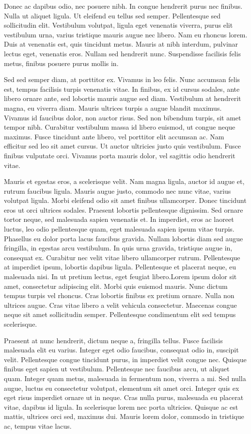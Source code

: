 Donec ac dapibus odio, nec posuere nibh. In congue hendrerit purus nec finibus. Nulla ut aliquet ligula. Ut eleifend eu tellus sed semper. Pellentesque sed sollicitudin elit. Vestibulum volutpat, ligula eget venenatis viverra, purus elit vestibulum urna, varius tristique mauris augue nec libero. Nam eu rhoncus lorem. Duis at venenatis est, quis tincidunt metus. Mauris at nibh interdum, pulvinar lectus eget, venenatis eros. Nullam sed hendrerit nunc. Suspendisse facilisis felis metus, finibus posuere purus mollis in.

Sed sed semper diam, at porttitor ex. Vivamus in leo felis. Nunc accumsan felis est, tempus facilisis turpis venenatis vitae. In finibus, ex id cursus sodales, ante libero ornare ante, sed lobortis mauris augue sed diam. Vestibulum at hendrerit magna, eu viverra diam. Mauris ultrices turpis a augue blandit maximus. Vivamus id faucibus dolor, non auctor risus. Sed non bibendum turpis, sit amet tempor nibh. Curabitur vestibulum massa id libero euismod, ut congue neque maximus. Fusce tincidunt ante libero, vel porttitor elit accumsan ac. Nam efficitur sed leo sit amet cursus. Ut auctor ultricies justo quis vestibulum. Fusce finibus vulputate orci. Vivamus porta mauris dolor, vel sagittis odio hendrerit vitae.

Mauris et egestas eros, a scelerisque velit. Nam magna ligula, auctor id augue et, rutrum faucibus ligula. Mauris augue justo, commodo nec nunc vitae, varius volutpat ligula. Morbi eleifend odio sit amet finibus ullamcorper. Donec tincidunt eros ut orci ultrices sodales. Praesent lobortis pellentesque dignissim. Sed ornare tortor neque, sed malesuada sapien venenatis et. In imperdiet, eros ac laoreet luctus, leo odio pellentesque quam, eget malesuada sapien ipsum vitae turpis. Phasellus eu dolor porta lacus faucibus gravida. Nullam lobortis diam sed augue fringilla, in egestas arcu vestibulum. In quis urna gravida, tristique augue in, consequat ex. Curabitur nec velit vitae libero ullamcorper rutrum. Pellentesque at imperdiet ipsum, lobortis dapibus ligula. Pellentesque et placerat neque, eu malesuada nisi. In ut pretium lectus, eget feugiat libero.Lorem ipsum dolor sit amet, consectetur adipiscing elit. Morbi quis euismod mauris. Nunc dictum tempus turpis vel rhoncus. Cras lobortis finibus ex pretium ornare. Nulla non ultrices augue. Cras vitae libero a velit vehicula consectetur. Maecenas congue neque sit amet sollicitudin semper. Pellentesque condimentum elit sed tempus scelerisque.

Praesent at nunc hendrerit, dictum neque a, fringilla tellus. Fusce facilisis malesuada elit eu varius. Integer eget odio faucibus, consequat odio in, suscipit velit. Pellentesque congue tincidunt purus, in imperdiet velit congue nec. Quisque finibus eget sapien ut vestibulum. Pellentesque nec faucibus arcu, ut aliquet quam. Integer quam metus, malesuada in fermentum non, viverra a mi. Sed nulla augue, luctus eu consectetur volutpat, elementum sit amet orci. Integer quis ex eget risus imperdiet ornare ut in neque. Cras nulla purus, malesuada eu placerat vitae, dapibus id ligula. In scelerisque lorem nec porta ultricies. Quisque ac est mattis, ultrices orci sed, maximus dui. Mauris lorem dolor, commodo in tristique ac, tempus vitae lacus.

